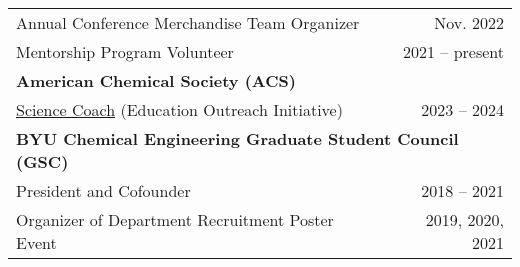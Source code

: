 \documentclass[letterpaper,11pt]{article}
\begin{document}
\begin{longtable}{@{}p{}r@{}}
  \hspace{3mm} \small Annual Conference Merchandise Team Organizer                                                                                                                                                       & Nov. 2022                                                                   \\
  \hspace{3mm} \small Mentorship Program Volunteer                                                                                                                                                                       & 2021 -- present                                                             \\ [4pt]
  \multicolumn{2}{l}{\hspace{-3mm} \bf{American Chemical Society (ACS)}}                                                                                                                                                                                                                               \\
  \hspace{3mm} \small \href{https://www.acs.org/education/outreach/science-coaches.html}{Science Coach} (Education Outreach Initiative)                                                                                  & 2023 -- 2024                                                                \\
  \multicolumn{2}{l}{\hspace{-3mm} \bf{BYU Chemical Engineering Graduate Student Council (GSC)}}                                                                                                                                                                                                       \\
  \hspace{3mm} \small President and Cofounder                                                                                                                                                                            & 2018 -- 2021                                                                \\
  \hspace{3mm} \small Organizer of Department Recruitment Poster Event                                                                                                                                                   & 2019, 2020, 2021                                                            \\

\end{longtable}
\end{document}
